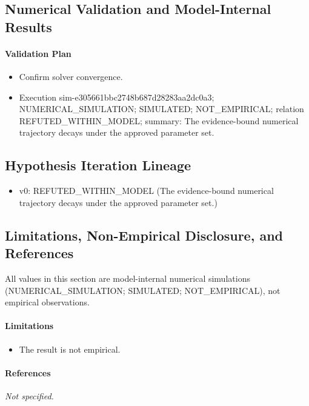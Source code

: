 \documentclass[11pt]{article}
\begin{document}
\subsection{Numerical Validation and Model-Internal Results}

\paragraph{Validation Plan}
\begin{itemize}\raggedright
\item Confirm solver convergence.
\end{itemize}

\begin{itemize}
\item Execution sim-e305661bbc2748b687d28283aa2dc0a3; NUMERICAL\_SIMULATION; SIMULATED; NOT\_EMPIRICAL; relation REFUTED\_WITHIN\_MODEL; summary: The evidence-bound numerical trajectory decays under the approved parameter set.
\end{itemize}

\subsection{Hypothesis Iteration Lineage}

\begin{itemize}\raggedright
\item v0: REFUTED\_\allowbreak{}WITHIN\_\allowbreak{}MODEL (The evidence-bound numerical trajectory decays under the approved parameter set.)
\end{itemize}

\subsection{Limitations, Non-Empirical Disclosure, and References}

\noindent All values in this section are model-internal numerical simulations (NUMERICAL\_SIMULATION; SIMULATED; NOT\_EMPIRICAL), not empirical observations.

\paragraph{Limitations}
\begin{itemize}\raggedright
\item The result is not empirical.
\end{itemize}

\paragraph{References}
\emph{Not specified.}
\end{document}
